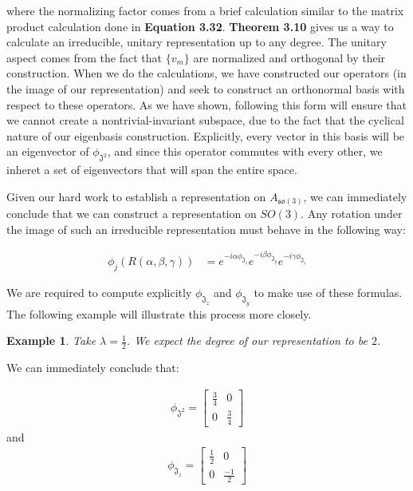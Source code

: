\documentclass[10pt]{ucthesis}
\newtheorem{example}[definition]{Example}
\begin{document}
where the normalizing factor comes from a brief calculation similar to the matrix product calculation done in \textbf{Equation 3.32}. \textbf{Theorem 3.10} gives us a way to calculate an irreducible, unitary representation up to any degree. The unitary aspect comes from the fact that $\{v_m\}$ are normalized and orthogonal by their construction. When we do the calculations, we have constructed our operators (in the image of our representation) and seek to construct an orthonormal basis with respect to these operators. As we have shown, following this form will ensure that we cannot create a nontrivial-invariant subspace, due to the fact that the cyclical nature of our eigenbasis construction. Explicitly, every vector in this basis will be an eigenvector of $\phi_{\mathfrak{J^2}}$, and since this operator commutes with every other, we inheret a set of eigenvectors that will span the entire space.

Given our hard work to establish a representation on $A_\mathfrak{so(3)}$, we can immediately conclude that we can construct a representation on $SO(3)$. Any rotation under the image of such an irreducible representation must behave in the following way:

\begin{equation}
\begin{aligned}
	\phi_j(R(\alpha,\beta,\gamma)) &= e^{-i\alpha\phi_{\mathfrak{J}_z}}e^{-i\beta\phi_{\mathfrak{J}_y}}e^{-i\gamma\phi_{\mathfrak{J}_z}}	
\end{aligned}
\end{equation}

We are required to compute explicitly $\phi_{\mathfrak{J}_z}$ and $\phi_{\mathfrak{J}_y}$ to make use of these formulas. The following example will illustrate this process more closely.

\begin{example}
	Take $\lambda= \frac{1}{2}$. We expect the degree of our representation to be $2$. 
\end{example}

We can immediately conclude that:

\begin{equation}
\begin{aligned}
	\phi_{\mathfrak{J^2}} = \begin{bmatrix}
									\frac{3}{4} & 0 \\
									0 & \frac{3}{4}
								\end{bmatrix}
\end{aligned}
\end{equation}
and 
\begin{equation}
\begin{aligned}
	\phi_{\mathfrak{J}_z} = \begin{bmatrix}
									\frac{1}{2} & 0 \\
									0 & \frac{-1}{2}
								\end{bmatrix}
\end{aligned}
\end{equation}
\end{document}
